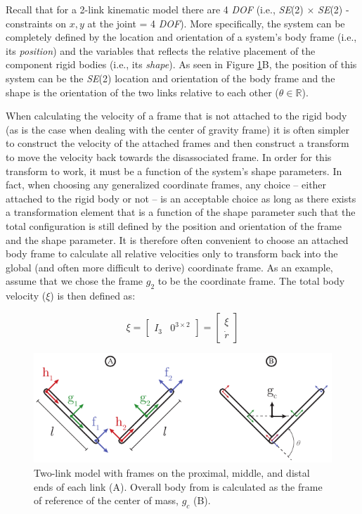 \documentclass[a4paper]{article}
\begin{document}
 
Recall that for a 2-link kinematic model there are 4 \emph{DOF} (i.e., \emph{SE}(2) $\times$ \emph{SE}(2) - constraints on $x,y$ at the joint = 4 \emph{DOF}). More specifically, the system can be completely defined by the location and orientation of a system's body frame (i.e., its \emph{position}) and the variables that reflects the relative placement of the component rigid bodies (i.e., its \emph{shape}). As seen in Figure \ref{fig:kinematics}B, the position of this system can be the \emph{SE}(2) location and orientation of the body frame and the shape is the orientation of the two links relative to each other ($\theta \in \mathbb{R}$).

When calculating the velocity of a frame that is not attached to the rigid body (as is the case when dealing with the center of gravity frame) it is often simpler to construct the velocity of the attached frames and then construct a transform to move the velocity back towards the disassociated frame. In order for this transform to work, it must be a function of the system's shape parameters. In fact, when choosing any generalized coordinate frames, any choice -- either attached to the rigid body or not -- is an acceptable choice as long as there exists a transformation element that is a function of the shape parameter such that the total configuration is still defined by the position and orientation of the frame and the shape parameter. It is therefore often convenient to choose an attached body frame to calculate all relative velocities only to transform back into the global (and often more difficult to derive) coordinate frame. As an example, assume that we chose the frame \emph{$g_2$} to be the coordinate frame. The total body velocity ($\xi$) is then defined as:

\begin{equation}\label{eq:totalbodyvelocity}
\xi 
=
\begin{bmatrix}
I_3  & 0^{3\times2}
\end{bmatrix}
=
\begin{bmatrix}
\xi \\
\dot{r}
\end{bmatrix}
\end{equation}

\begin{figure}[H]
\centering
\includegraphics{Figure1}
\caption{Two-link model with frames on the proximal, middle, and distal ends of each link (A). Overall body from is calculated as the frame of reference of the center of mass, \emph{$g_{c}$} (B).}\label{fig:kinematics}
\end{figure}
\end{document}
